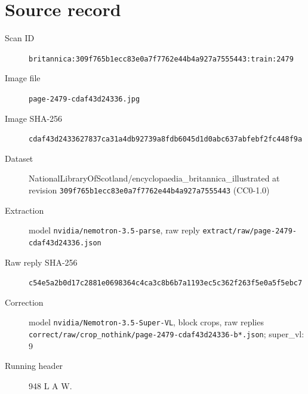 \documentclass{article}
\begin{document}
\section*{Source record}
\begin{description}
\item[Scan ID] \texttt{britannica:309f765b1ecc83e0a7f7762e44b4a927a7555443:train:2479}
\item[Image file] \texttt{page-2479-cdaf43d24336.jpg}
\item[Image SHA-256] \texttt{cdaf43d2433627837ca31a4db92739a8fdb6045d1d0abc637abfebf2fc448f9a}
\item[Dataset] NationalLibraryOfScotland/encyclopaedia\_britannica\_illustrated at revision \texttt{309f765b1ecc83e0a7f7762e44b4a927a7555443} (CC0-1.0)
\item[Extraction] model \texttt{nvidia/nemotron-3.5-parse}, raw reply \texttt{extract/raw/page-2479-cdaf43d24336.json}
\item[Raw reply SHA-256] \texttt{c54e5a2b0d17c2881e0698364c4ca3c8b6b7a1193ec5c362f263f5e0a5f5ebc7}
\item[Correction] model \texttt{nvidia/Nemotron-3.5-Super-VL}, block crops, raw replies \texttt{correct/raw/crop\_nothink/page-2479-cdaf43d24336-b*.json}; super\_vl: 9
\item[Running header] 948 L A W.
\end{description}
\end{document}
